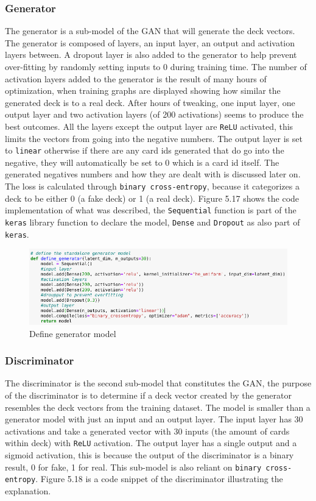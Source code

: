 \documentclass{report} %
\begin{document}
\subsubsection{Generator}
The generator is a sub-model of the GAN that will generate the deck vectors. The generator is composed of layers, an input layer, an output and activation layers between. A dropout layer is also added to the generator to help prevent over-fitting by randomly setting inputs to 0 during training time. The number of activation layers added to the generator is the result of many hours of optimization, when training graphs are displayed showing how similar the generated deck is to a real deck. After hours of tweaking, one input layer, one output layer and two activation layers (of 200 activations) seems to produce the best outcomes. All the layers except the output layer are \texttt{ReLU} activated, this limits the vectors from going into the negative numbers. The output layer is set to \texttt{linear} otherwise if there are any card ids generated that do go into the negative, they will automatically be set to 0 which is a card id itself. The generated negatives numbers and how they are dealt with is discussed later on. The loss is calculated through \texttt{binary cross-entropy}, because it categorizes a deck to be either 0 (a fake deck) or 1 (a real deck). Figure 5.17 shows the code implementation of what was described, the \nolinkurl{Sequential} function is part of the \texttt{keras} library function to declare the model, \nolinkurl{Dense} and \nolinkurl{Dropout} as also part of \texttt{keras}.

\begin{figure}[H]
\centering
\includegraphics[width=1.25\textwidth]{generator}
\caption{Define generator model\protect}
 \label{board}
\end{figure}
\subsubsection{Discriminator}
The discriminator is the second sub-model that constitutes the GAN, the purpose of the discriminator is to determine if a deck vector created by the generator resembles the deck vectors from the training dataset. The model is smaller than a generator model with just an input and an output layer. The input layer has 30 activations and take a generated vector with 30 inputs (the amount of cards within deck) with \texttt{ReLU} activation. The output layer has a single output and a sigmoid activation, this is because the output of the discriminator is a binary result, 0 for fake, 1 for real. This sub-model is also reliant on \texttt{binary cross-entropy}. Figure 5.18 is a code snippet of the discriminator illustrating the explanation.
\end{document}
